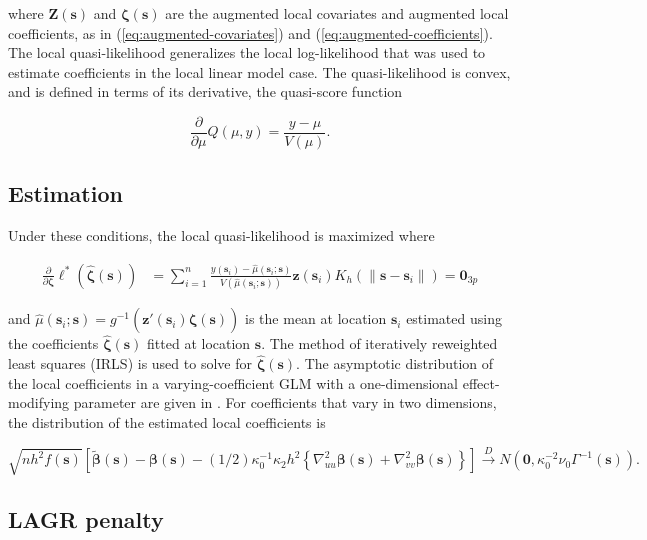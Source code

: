 \documentclass[12pt,english,authoryear, review]{article}\usepackage[]{graphicx}\usepackage[]{color}
\theoremstyle{plain}
\theoremstyle{plain}
\begin{document}
where $\bm{Z}\left(\bm{s}\right)$ and $\bm{\zeta}\left(\bm{s}\right)$
are the augmented local covariates and augmented local coefficients,
as in (\ref{eq:augmented-covariates}) and (\ref{eq:augmented-coefficients}).
The local quasi-likelihood generalizes the local log-likelihood that
was used to estimate coefficients in the local linear model case.
The quasi-likelihood is convex, and is defined in terms of its derivative,
the quasi-score function

\[
\frac{\partial}{\partial\mu}Q\left(\mu,y\right)=\frac{y-\mu}{V\left(\mu\right)}.
\]



\subsection{Estimation}

Under these conditions, the local quasi-likelihood is maximized where

\begin{align}
\frac{\partial}{\partial\bm{\zeta}}\mathcal{\ell}^{*}\left(\hat{\bm{\zeta}}\left(\bm{s}\right)\right) & =\sum_{i=1}^{n}\frac{y\left(\bm{s}_{i}\right)-\hat{\mu}\left(\bm{s}_{i};\bm{s}\right)}{V\left(\hat{\mu}\left(\bm{s}_{i};\bm{s}\right)\right)}\bm{z}\left(\bm{s}_{i}\right)K_{h}\left(\|\bm{s}-\bm{s}_{i}\|\right)=\bm{0}_{3p}
\end{align}


and $\hat{\mu}\left(\bm{s}_{i};\bm{s}\right)=g^{-1}\left(\bm{z}'\left(\bm{s}_{i}\right)\hat{\bm{\zeta}}\left(\bm{s}\right)\right)$
is the mean at location $\bm{s}_{i}$ estimated using the coefficients
$\hat{\bm{\zeta}}\left(\bm{s}\right)$ fitted at location $\bm{s}$.
The method of iteratively reweighted least squares (IRLS) is used
to solve for $\hat{\bm{\zeta}}\left(\bm{s}\right)$. The asymptotic
distribution of the local coefficients in a varying-coefficient GLM
with a one-dimensional effect-modifying parameter are given in \citet{Cai-Fan-Li-2000}.
For coefficients that vary in two dimensions, the distribution of
the estimated local coefficients is

\[
\sqrt{{nh^{2}f(\bm{{s}})}}\left[\tilde{\bm{\beta}}(\bm{s})-\bm{\beta}(\bm{s})-(1/2)\kappa_{0}^{-1}\kappa_{2}h^{2}\left\{ \nabla_{uu}^{2}\bm{\beta}(\bm{s})+\nabla_{vv}^{2}\bm{\beta}(\bm{s})\right\} \right]\xrightarrow{{D}}N\left(\bm{0},\kappa_{0}^{-2}\nu_{0}\Gamma^{-1}(\bm{s})\right).
\]



\subsection{LAGR penalty}
\end{document}

